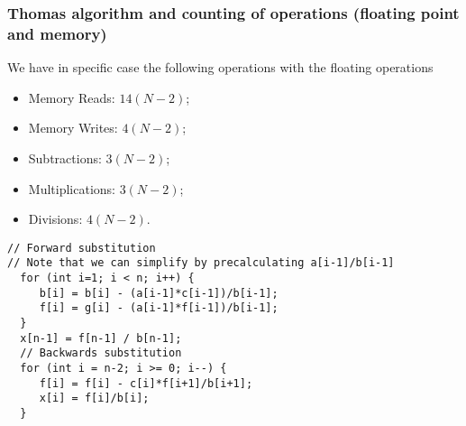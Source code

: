 \documentclass{beamer}
\begin{document}
\begin{frame}
\frametitle{Thomas algorithm and counting of operations (floating point and memory)}

\begin{block}{}

We have in specific case the following operations with the floating operations

\begin{itemize}
\item Memory Reads: $14(N-2)$;

\item Memory Writes: $4(N-2)$; 

\item Subtractions: $3(N-2)$; 

\item Multiplications: $3(N-2)$;

\item Divisions: $4(N-2)$.
\end{itemize}

\noindent
\end{block}

\begin{block}{}













\begin{verbatim}
// Forward substitution    
// Note that we can simplify by precalculating a[i-1]/b[i-1]
  for (int i=1; i < n; i++) {
     b[i] = b[i] - (a[i-1]*c[i-1])/b[i-1];
     f[i] = g[i] - (a[i-1]*f[i-1])/b[i-1];
  }
  x[n-1] = f[n-1] / b[n-1];
  // Backwards substitution                                                           
  for (int i = n-2; i >= 0; i--) {
     f[i] = f[i] - c[i]*f[i+1]/b[i+1];
     x[i] = f[i]/b[i];
  }

\end{verbatim}

\end{block}
\end{frame}
\end{document}
